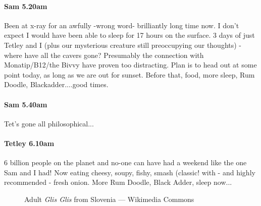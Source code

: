 \paragraph{Sam 5.20am}
Been at x-ray for an awfully -wrong word- brilliantly long time now. I don't expect I would have been able to sleep for 17 hours on the surface. 3 days of just Tetley and I (plus our mysterious creature still preoccupying our thoughts) - where have all the cavers gone? Presumably the connection with Monatip/B12/the Bivvy have proven too distracting. Plan is to head out at some point today, as long as we are out for sunset. Before that, food, more sleep, Rum Doodle, Blackadder....good times.


\paragraph{Sam 5.40am}
Tet’s gone all philosophical...


\paragraph{Tetley 6.10am}
6 billion people on the planet and no-one can have had a weekend like the one Sam and I had! Now eating cheesy, soupy, fishy, smash (classic! with - and highly recommended - fresh onion. More Rum Doodle, Black Adder, sleep now...

\begin{figure}[t!]
\checkoddpage \ifoddpage \forcerectofloat \else \forceversofloat \fi
\centering
{}
\caption{Adult \emph{Glis Glis} from Slovenia --- Wikimedia Commons}
\label{dormouse}
\end{figure}

